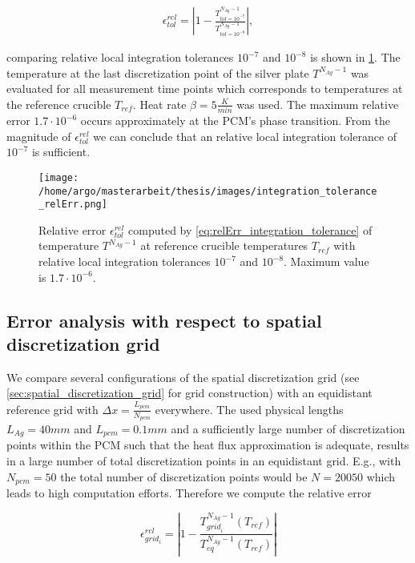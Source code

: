 \documentclass{scrartcl}[12pt, halfparskip]
\numberwithin{equation}{section}
\numberwithin{figure}{section}
\numberwithin{table}{section}
\begin{document}
\begin{align}
	\epsilon_{tol}^{rel} = \left|1 - \frac{T^{N_{Ag}-1}_{tol=10^{-7}}}{T^{N_{Ag}-1}_{tol=10^{-8}}} \right|,
	\label{eq:relErr_integration_tolerance}
\end{align}

comparing relative local integration tolerances $10^{-7}$ and $10^{-8}$ is shown in \cref{fig:integration_tolerance_error}.
The temperature at the last discretization point of the silver plate $T^{N_{Ag}-1}$ was evaluated for all measurement time points which corresponds to temperatures at the reference crucible $T_{ref}$. Heat rate $\beta = 5 \frac{K}{min}$ was used.
The maximum relative error $1.7 \cdot 10^{-6}$ occurs approximately at the PCM's phase transition. 
From the magnitude of $\epsilon_{tol}^{rel}$ we can conclude that an relative local integration tolerance of $10^{-7}$ is sufficient. \\


\begin{figure}[H]
	\centering
	\texttt{[image: /home/argo/masterarbeit/thesis/images/integration\_tolerance\_relErr.png]}
	\caption{Relative error $\epsilon_{tol}^{rel}$ computed by \cref{eq:relErr_integration_tolerance} of temperature $T^{N_{Ag}-1}$ at reference crucible temperatures $T_{ref}$ with relative local integration tolerances $10^{-7}$ and $10^{-8}$. Maximum value is $1.7 \cdot 10^{-6}$.}
	\label{fig:integration_tolerance_error}
\end{figure}


\subsection{Error analysis with respect to spatial discretization grid}
We compare several configurations of the spatial discretization grid (see \cref{sec:spatial_discretization_grid} for grid construction) with an equidistant reference grid with $\Delta x = \frac{L_{pcm}}{N_{pcm}}$ everywhere. The used physical lengths $L_{Ag}=40mm$ and $L_{pcm}=0.1mm$ and a sufficiently large number of discretization points within the PCM such that the heat flux approximation is adequate, results in a large number of total discretization points in an equidistant grid. E.g., with $N_{pcm}=50$ the total number of discretization points would be $N=20050$ which leads to high computation efforts. Therefore we compute the relative error

\begin{equation}
	\epsilon_{grid_i}^{rel} = \left| 1 - \frac{T_{{grid}_i}^{N_{Ag}-1}(T_{ref})}{T_{eq}^{N_{Ag}-1}(T_{ref})} \right|
	\label{eq:relErr_grid}
\end{equation}
\end{document}
